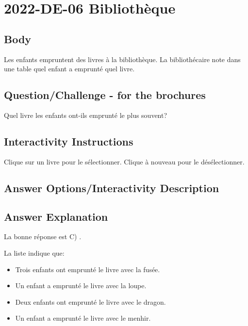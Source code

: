 \documentclass[a4paper,11pt]{report}
\newcommand{\taskGraphicsFolder}{..}
\begin{document}
\section*{\centering{} 2022-DE-06 Bibliothèque}


\subsection*{Body}

Les enfants empruntent des livres à la bibliothèque. La bibliothécaire note dans une table quel enfant a emprunté quel livre.

{\em


\subsection*{Question/Challenge - for the brochures}

Quel livre les enfants ont-ils emprunté le plus souvent?

{\centering%
\par}

}


\subsection*{Interactivity Instructions}

Clique sur un livre pour le sélectionner. Clique à nouveau pour le désélectionner.

\begingroup
\renewcommand{\arraystretch}{1.5}
\subsection*{Answer Options/Interactivity Description}



\endgroup

\subsection*{Answer Explanation}

La bonne réponse est C) \raisebox{-0.5ex}{}.

La liste indique que:

\begin{itemize}
  \item Trois enfants ont emprunté le livre avec la fusée.
  \item Un enfant a emprunté le livre avec la loupe.
  \item Deux enfants ont emprunté le livre avec le dragon.
  \item Un enfant a emprunté le livre avec le menhir.
\end{itemize}
\end{document}

